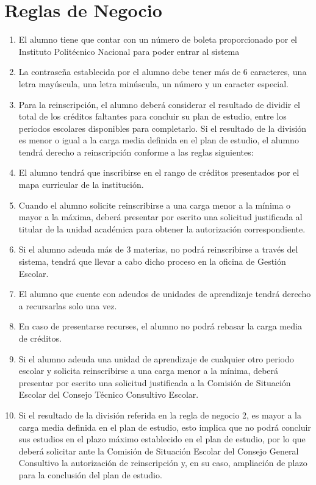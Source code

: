 \section{Reglas de Negocio}
\begin{enumerate}[{RN} 1.]
\item El alumno tiene que contar con un número de boleta proporcionado por el Instituto Politécnico Nacional para poder entrar al sistema
\item La contraseña establecida por el alumno debe tener más de 6 caracteres, una letra mayúscula, una letra minúscula, un número y un caracter especial.
\item Para la reinscripción, el alumno deberá considerar el resultado de dividir el total de los créditos faltantes para concluir su plan de estudio, entre los periodos escolares disponibles para completarlo. Si el resultado de la división es menor o igual a la carga media definida en el plan de estudio, el alumno tendrá derecho a reinscripción conforme a las reglas siguientes:
\item El alumno tendrá que inscribirse en el rango de créditos presentados por el mapa curricular de la institución.
\item Cuando el alumno solicite reinscribirse a una carga menor a la mínima o mayor a la máxima, deberá presentar por escrito una solicitud justificada  al titular de la unidad académica para obtener la autorización correspondiente.
\item Si el alumno adeuda más de 3 materias, no podrá reinscribirse a través del sistema, tendrá que llevar a cabo dicho proceso en la oficina de Gestión Escolar. 
\item El alumno que cuente con adeudos de unidades de aprendizaje tendrá derecho a recursarlas solo una vez.
\item En caso de presentarse recurses, el alumno no podrá rebasar la carga media de créditos.
\item Si el alumno adeuda una unidad de aprendizaje de cualquier otro periodo escolar y solicita reinscribirse a una carga menor a la mínima, deberá presentar por escrito una solicitud justificada a la Comisión de Situación Escolar del Consejo Técnico Consultivo Escolar.
\item Si el resultado de la división referida en la regla de negocio 2, es mayor a la carga media definida en el plan de estudio, esto implica que no podrá concluir sus estudios en el plazo máximo establecido en el plan de estudio, por lo que deberá solicitar ante la Comisión de Situación Escolar del Consejo General Consultivo la autorización de reinscripción y, en su caso, ampliación de plazo para la conclusión del plan de estudio.

\end{enumerate}
